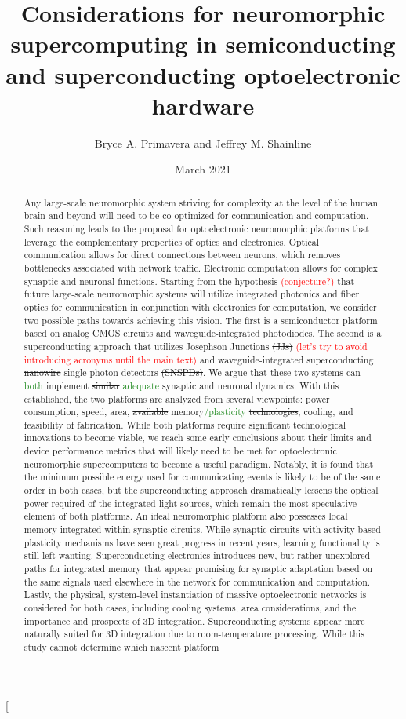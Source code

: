\documentclass[twocolumn]{article}
\title{\textcolor{OliveGreen}{Considerations for neuromorphic supercomputing in semiconducting and superconducting optoelectronic hardware}}
\author{Bryce A. Primavera and Jeffrey M. Shainline}
\date{March 2021}
\begin{document}
\twocolumn[
\begin{@twocolumnfalse}
\maketitle
\begin{abstract}
Any large-scale neuromorphic system striving for complexity at the level of the human brain and beyond will need to be co-optimized for communication and computation. Such reasoning leads to the proposal for optoelectronic neuromorphic platforms that leverage the complementary properties of optics and electronics. Optical communication allows for direct connections between neurons, which removes bottlenecks associated with network traffic. Electronic computation allows for complex synaptic and neuronal functions. Starting from the hypothesis \textcolor{red}{(conjecture?)} that future large-scale neuromorphic systems will utilize integrated photonics and fiber optics for communication in conjunction with electronics for computation, we consider two possible paths towards achieving this vision. The first is a semiconductor platform based on analog CMOS circuits and waveguide-integrated photodiodes. The second is a superconducting approach that utilizes Josephson Junctions \sout{(JJs)} \textcolor{red}{(let's try to avoid introducing acronyms until the main text)} and waveguide-integrated superconducting \sout{nanowire} single-photon detectors \sout{(SNSPDs)}. We argue that these two systems can \textcolor{ForestGreen}{both} implement \sout{similar} \textcolor{ForestGreen}{adequate} synaptic and neuronal dynamics. With this established, the two platforms are analyzed from several viewpoints: power consumption, speed, area, \sout{available} memory\textcolor{ForestGreen}{/plasticity} \sout{technologies}, cooling, and \sout{feasibility of} fabrication. While both platforms require significant technological innovations to become viable, we reach some early conclusions about their limits and device performance metrics that will \sout{likely} need to be met for optoelectronic neuromorphic supercomputers to become a useful paradigm. Notably, it is found that the minimum possible energy used for communicating events is likely to be of the same order in both cases, but the superconducting approach dramatically lessens the optical power required of the integrated light-sources, which remain the most speculative element of both platforms. An ideal neuromorphic platform also possesses local memory integrated within synaptic circuits. While synaptic circuits with activity-based plasticity mechanisms have seen great progress in recent years, learning functionality is still left wanting. Superconducting electronics introduces new, but rather unexplored paths for integrated memory that appear promising for synaptic adaptation based on the same signals used elsewhere in the network for communication and computation. Lastly, the physical, system-level instantiation of massive optoelectronic networks is considered for both cases, including cooling systems, area considerations, and the importance and prospects of 3D integration. Superconducting systems appear more naturally suited for 3D integration due to room-temperature processing. While this study cannot determine which nascent platform 
\end{abstract}
\end{@twocolumnfalse}
\end{document}
